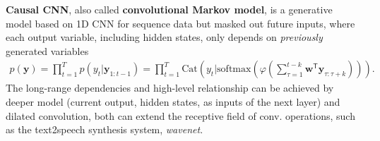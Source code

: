 \textbf{Causal CNN}, also called \textbf{convolutional Markov model},
is a generative model
based on 1D CNN for sequence data but masked out future inputs,
where each output variable, including hidden states, only depends on \textit{previously} generated variables
\begin{gather}
    p(\bm{y})
    = \prod_{t=1}^T p(y_t|\bm{y}_{1:t-1})
    = \prod_{t=1}^T \mathrm{Cat}(y_t|\mathrm{softmax}(\varphi(\sum_{\tau=1}^{t-k}\bm{w}^\mathsf{T}\bm{y}_{\tau:\tau+k}))).
\end{gather}
The long-range dependencies and high-level relationship can be achieved by deeper model (current output, hidden states, as inputs of the next layer) and dilated convolution, both can extend the receptive field of conv. operations, such as the text2speech synthesis system, \textit{wavenet}.
